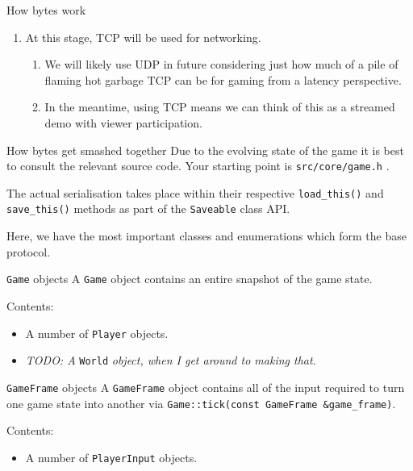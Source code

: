 \documentclass[a4paper,draft]{article}
\begin{document}
\begin{section}{How bytes work}
\begin{enumerate}
    \item At this stage, TCP will be used for networking.
    \begin{enumerate}
      \item We will likely use UDP in future considering just how much of a pile of flaming hot garbage TCP can be for gaming from a latency perspective.
      \item In the meantime, using TCP means we can think of this as a streamed demo with viewer participation.
    \end{enumerate}
  \end{enumerate}
\end{section}

\begin{section}{How bytes get smashed together}
  Due to the evolving state of the game it is best to consult the relevant source code.
  Your starting point is \texttt{src/core/game.h} .

  The actual serialisation takes place within their respective \texttt{load\_this()} and \texttt{save\_this()} methods as part of the \texttt{Saveable} class API.

  Here, we have the most important classes and enumerations which form the base protocol.

  \begin{subsection}{\texttt{Game} objects}
    A \texttt{Game} object contains an entire snapshot of the game state.

    Contents:

    \begin{itemize}
      \item A number of \texttt{Player} objects.
      \item \textit{TODO: A} \texttt{World} \textit{object, when I get around to making that.}
    \end{itemize}
  \end{subsection}

  \begin{subsection}{\texttt{GameFrame} objects}
    A \texttt{GameFrame} object contains all of the input required to turn one game state into another via \texttt{Game::tick(const GameFrame \&game\_frame)}.

    Contents:

    \begin{itemize}
      \item A number of \texttt{PlayerInput} objects.
    \end{itemize}
  \end{subsection}


\end{section}
\end{document}
